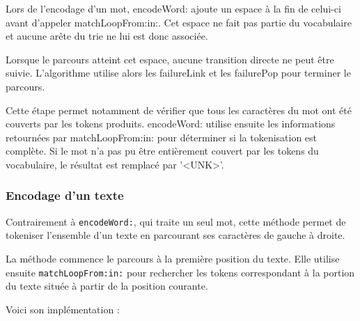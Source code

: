 \documentclass[12pt,a4paper]{report}
\begin{document}
	Lors de l'encodage d'un mot, encodeWord: ajoute un espace à la fin de celui-ci avant d'appeler matchLoopFrom:in:. Cet espace ne fait pas partie du vocabulaire et aucune arête du trie ne lui est donc associée.
	
	Lorsque le parcours atteint cet espace, aucune transition directe ne peut être suivie. L'algorithme utilise alors les failureLink et les failurePop pour terminer le parcours.
	
	Cette étape permet notamment de vérifier que tous les caractères du mot ont été couverts par les tokens produits. encodeWord: utilise ensuite les informations retournées par matchLoopFrom:in: pour déterminer si la tokenisation est complète. Si le mot n'a pas pu être entièrement couvert par les tokens du vocabulaire, le résultat est remplacé par '<UNK>'.
	
	\subsubsection{Encodage d'un texte}
	
	Contrairement à \texttt{encodeWord:}, qui traite un seul mot, cette méthode permet de tokeniser l'ensemble d'un texte en parcourant ses caractères de gauche à droite.
	
	La méthode commence le parcours à la première position du texte. Elle utilise ensuite \texttt{matchLoopFrom:in:} pour rechercher les tokens correspondant à la portion du texte située à partir de la position courante.
	
	Voici son implémentation :
	
\end{document}
